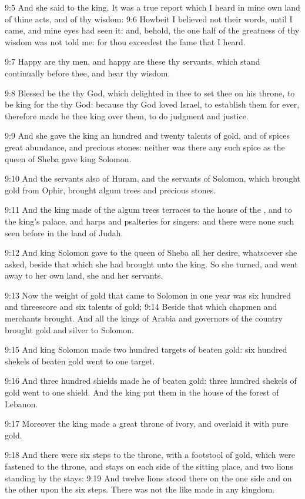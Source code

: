 9:5 And she said to the king, It was a true report which I heard in mine own land of thine acts, and of thy wisdom: 9:6 Howbeit I believed not their words, until I came, and mine eyes had seen it: and, behold, the one half of the greatness of thy wisdom was not told me: for thou exceedest the fame that I heard.

9:7 Happy are thy men, and happy are these thy servants, which stand continually before thee, and hear thy wisdom.

9:8 Blessed be the \LORD thy God, which delighted in thee to set thee on his throne, to be king for the \LORD thy God: because thy God loved Israel, to establish them for ever, therefore made he thee king over them, to do judgment and justice.

9:9 And she gave the king an hundred and twenty talents of gold, and of spices great abundance, and precious stones: neither was there any such spice as the queen of Sheba gave king Solomon.

9:10 And the servants also of Huram, and the servants of Solomon, which brought gold from Ophir, brought algum trees and precious stones.

9:11 And the king made of the algum trees terraces to the house of the \LORD, and to the king's palace, and harps and psalteries for singers: and there were none such seen before in the land of Judah.

9:12 And king Solomon gave to the queen of Sheba all her desire, whatsoever she asked, beside that which she had brought unto the king.  So she turned, and went away to her own land, she and her servants.

9:13 Now the weight of gold that came to Solomon in one year was six hundred and threescore and six talents of gold; 9:14 Beside that which chapmen and merchants brought. And all the kings of Arabia and governors of the country brought gold and silver to Solomon.

9:15 And king Solomon made two hundred targets of beaten gold: six hundred shekels of beaten gold went to one target.

9:16 And three hundred shields made he of beaten gold: three hundred shekels of gold went to one shield. And the king put them in the house of the forest of Lebanon.

9:17 Moreover the king made a great throne of ivory, and overlaid it with pure gold.

9:18 And there were six steps to the throne, with a footstool of gold, which were fastened to the throne, and stays on each side of the sitting place, and two lions standing by the stays: 9:19 And twelve lions stood there on the one side and on the other upon the six steps.  There was not the like made in any kingdom.

